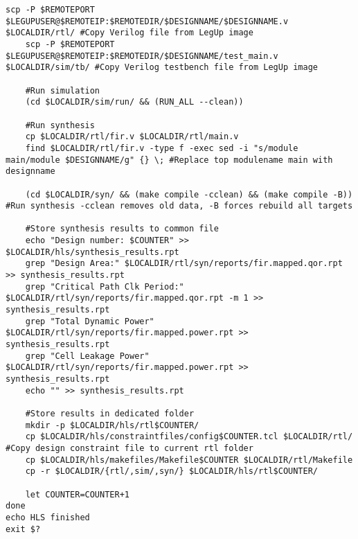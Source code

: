 \begin{lstlisting}[caption={HLS Script source code}label=lst:hlsscript]
	scp -P $REMOTEPORT $LEGUPUSER@$REMOTEIP:$REMOTEDIR/$DESIGNNAME/$DESIGNNAME.v $LOCALDIR/rtl/ #Copy Verilog file from LegUp image
	scp -P $REMOTEPORT $LEGUPUSER@$REMOTEIP:$REMOTEDIR/$DESIGNNAME/test_main.v $LOCALDIR/sim/tb/ #Copy Verilog testbench file from LegUp image
	
	#Run simulation
	(cd $LOCALDIR/sim/run/ && (RUN_ALL --clean)) 
	
	#Run synthesis
	cp $LOCALDIR/rtl/fir.v $LOCALDIR/rtl/main.v
	find $LOCALDIR/rtl/fir.v -type f -exec sed -i "s/module main/module $DESIGNNAME/g" {} \; #Replace top modulename main with designname
	
	(cd $LOCALDIR/syn/ && (make compile -cclean) && (make compile -B)) #Run synthesis -cclean removes old data, -B forces rebuild all targets
	
	#Store synthesis results to common file
	echo "Design number: $COUNTER" >> $LOCALDIR/hls/synthesis_results.rpt
	grep "Design Area:" $LOCALDIR/rtl/syn/reports/fir.mapped.qor.rpt >> synthesis_results.rpt
	grep "Critical Path Clk Period:" $LOCALDIR/rtl/syn/reports/fir.mapped.qor.rpt -m 1 >> synthesis_results.rpt
	grep "Total Dynamic Power" $LOCALDIR/rtl/syn/reports/fir.mapped.power.rpt >> synthesis_results.rpt
	grep "Cell Leakage Power" $LOCALDIR/rtl/syn/reports/fir.mapped.power.rpt >> synthesis_results.rpt
	echo "" >> synthesis_results.rpt
	
	#Store results in dedicated folder
	mkdir -p $LOCALDIR/hls/rtl$COUNTER/
	cp $LOCALDIR/hls/constraintfiles/config$COUNTER.tcl $LOCALDIR/rtl/ #Copy design constraint file to current rtl folder
	cp $LOCALDIR/hls/makefiles/Makefile$COUNTER $LOCALDIR/rtl/Makefile
	cp -r $LOCALDIR/{rtl/,sim/,syn/} $LOCALDIR/hls/rtl$COUNTER/
	
	let COUNTER=COUNTER+1 
done
echo HLS finished
exit $?
\end{lstlisting}
